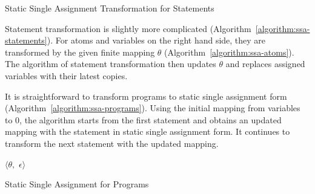 \begin{algorithm}
\begin{algorithmic}[1]
      \EndCase
      \EndCase
      \EndCase
    \EndMatch
    \EndFunction
  \end{algorithmic}
  \caption{Static Single Assignment Transformation for Statements}
  \label{algorithm:ssa-statements}
\end{algorithm}

Statement transformation is slightly more complicated
(Algorithm~\ref{algorithm:ssa-statements}). For
atoms and variables on the right hand side, they are transformed by the given
finite mapping $\theta$ (Algorithm~\ref{algorithm:ssa-atoms}).
The algorithm of statement transformation then updates $\theta$ and
replaces assigned variables with their latest copies.

It is straightforward to transform programs to static single
assignment form (Algorithm~\ref{algorithm:ssa-programs}). Using the
initial mapping from variables to $0$,
the algorithm starts from the first statement and obtains an
updated mapping with the statement in static single assignment form. It
continues to transform the next statement with the updated mapping.

\begin{algorithm}
  \begin{algorithmic}[1]
      \Case{$\epsilon$}
        \Return $\langle \theta,$ $\epsilon \rangle$
      \EndCase
      \EndCase
    \EndMatch
    \EndFunction
  \end{algorithmic}
  \caption{Static Single Assignment for Programs}
  \label{algorithm:ssa-programs}
\end{algorithm}

